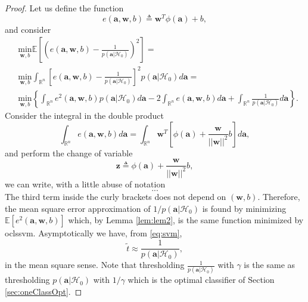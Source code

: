 \documentclass[draftcls,onecolumn,12pt]{IEEEtran}
\newcommand{\Exp}[1]{\mathbb{E}\left[#1\right]}
\begin{document}
\begin{proof}
Let us define the function 
\begin{equation}
	e(\mathbf{a},\mathbf{w},b) \triangleq \mathbf{w}^T  \phi (\mathbf{a}) + b,	
\end{equation}
and consider 
\begin{equation}
	\begin{aligned}
		&\underset{\mathbf{w},b}{\text{min}} \Exp{ \left( e(\mathbf{a},\mathbf{w},b) - \frac{1}{p(\mathbf{a}|\mathcal{H}_0)}\right) ^2} = \\
		&\underset{\mathbf{w},b}{\text{min}} \int_{\mathbb{R}^n} \left[ e(\mathbf{a},\mathbf{w},b) - \frac{1}{p(\mathbf{a}|\mathcal{H}_0)} \right] ^2 p(\mathbf{a}|\mathcal{H}_0) d\mathbf{a} = \\
		&\underset{\mathbf{w},b}{\text{min}} \left\lbrace \int_{\mathbb{R}^n} e^2(\mathbf{a},\mathbf{w},b) p(\mathbf{a}|\mathcal{H}_0) d\mathbf{a}
		-2\int_{\mathbb{R}^n} e(\mathbf{a},\mathbf{w},b) d\mathbf{a}
		+ \int_{\mathbb{R}^n} \frac{1}{p(\mathbf{a}|\mathcal{H}_0)} d\mathbf{a} \right\rbrace.
	\end{aligned}	
\end{equation}
Consider the integral in the double product
\begin{equation}
		\int_{\mathbb{R}^n} e(\mathbf{a},\mathbf{w},b) d\mathbf{a} =
		\int_{\mathbb{R}^n} \mathbf{w} ^T \left[ \phi (\mathbf{a}) + \frac{\mathbf{w}}{||\mathbf{w}||^2} b  \right] d\mathbf{a},		
\end{equation}
and perform the change of variable
\begin{equation}
	\mathbf{z} \triangleq \phi (\mathbf{a}) + \frac{\mathbf{w}}{||\mathbf{w}||^2} b, 	
\end{equation}
we can write, with a little abuse of notation
\begin{equation}
	...	
\end{equation}
The third term inside the curly brackets does not depend on $(\mathbf{w},b)$. Therefore, the mean square error approximation of $1/p(\mathbf{a}|\mathcal{H}_0)$ is found by minimizing $\Exp{e^2(\mathbf{a},\mathbf{w},b)}$ which, by Lemma \ref{lem:lem2}, is the same function minimized by \ac{oclssvm}. Asymptotically we have, from \eqref{eq:svm},
\begin{equation}
\label{eq:approx}
	\tilde{t} \approx \frac{1}{p(\mathbf{a}|\mathcal{H}_0)},	
\end{equation} 
in the mean square sense. Note that thresholding $\frac{1}{p(\mathbf{a}|\mathcal{H}_0)}$ with $\gamma$ is the same as thresholding $p(\mathbf{a}|\mathcal{H}_0)$ with $1/\gamma$ which is the optimal classifier of Section \ref{sec:oneClassOpt}.
\end{proof}
\end{document}
